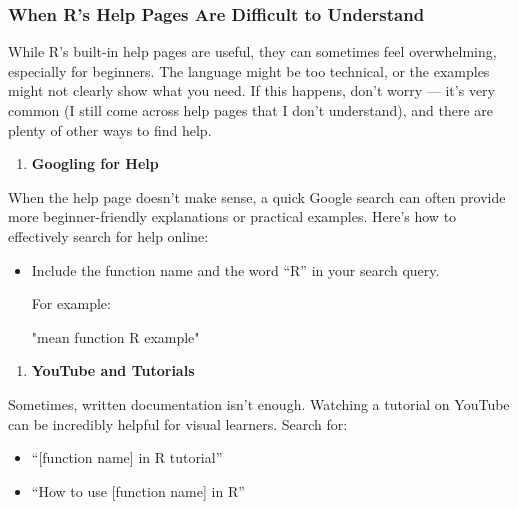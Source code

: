 \documentclass[
]{book}
\newenvironment{Shaded}{\begin{snugshade}}{\end{snugshade}}
\newcommand{\StringTok}[1]{\textcolor[rgb]{0.31,0.60,0.02}{#1}}
\providecommand{\tightlist}{%
  \setlength{\itemsep}{0pt}\setlength{\parskip}{0pt}}
\begin{document}
\subsubsection{\texorpdfstring{\textbf{When R's Help Pages Are Difficult to Understand}}{When R's Help Pages Are Difficult to Understand}}\label{when-rs-help-pages-are-difficult-to-understand}

While R's built-in help pages are useful, they can sometimes feel overwhelming, especially for beginners. The language might be too technical, or the examples might not clearly show what you need. If this happens, don't worry --- it's very common (I still come across help pages that I don't understand), and there are plenty of other ways to find help.

\begin{enumerate}
\def\labelenumi{\arabic{enumi}.}
\tightlist
\item
  \textbf{Googling for Help}
\end{enumerate}

When the help page doesn't make sense, a quick Google search can often provide more beginner-friendly explanations or practical examples. Here's how to effectively search for help online:

\begin{itemize}
\item
  Include the function name and the word ``R'' in your search query.

  For example:

\begin{Shaded}
\begin{Highlighting}[]
\StringTok{"mean function R example"}
\end{Highlighting}
\end{Shaded}
\end{itemize}

\begin{enumerate}
\def\labelenumi{\arabic{enumi}.}
\setcounter{enumi}{1}
\tightlist
\item
  \textbf{YouTube and Tutorials}
\end{enumerate}

Sometimes, written documentation isn't enough. Watching a tutorial on YouTube can be incredibly helpful for visual learners. Search for:

\begin{itemize}
\item
  ``{[}function name{]} in R tutorial''
\item
  ``How to use {[}function name{]} in R''
\end{itemize}
\end{document}
